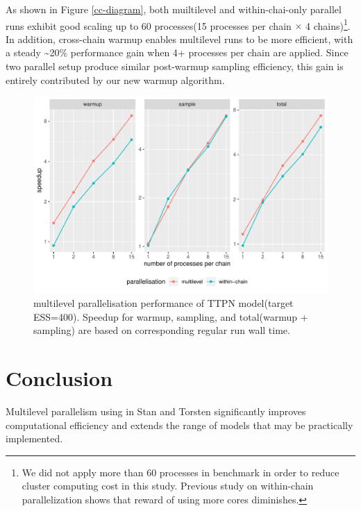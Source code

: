 \documentclass[11pt, reqno, oneside]{amsart}
\begin{document}
As shown in Figure \ref{cc-diagram}, both muiltilevel and
within-chai-only parallel runs exhibit good scaling up to 60
processes(15 processes per chain \(\times\) 4 chains)\footnote{We did not apply more than 60 processes in benchmark in order
to reduce cluster computing cost in this study. Previous study on within-chain parallelization
\cite{torsten_pmx_group} shows that reward of using more cores
diminishes.}. In
addition, cross-chain warmup enables multilevel runs to be more
efficient, with a steady \textasciitilde{}20\% performance gain when 4+ processes per
chain are applied. Since two parallel setup produce similar
post-warmup sampling efficiency, this gain is entirely contributed by
our new warmup algorithm.

\begin{figure}[htbp]
\centering
\includegraphics[width=\textwidth]{./figure/ttpn2_perf_benchmark.pdf}
\caption{multilevel parallelisation performance of TTPN model(target ESS=400). Speedup for warmup, sampling, and total(warmup + sampling) are based on corresponding regular run wall time. \label{ttpn_perf}}
\end{figure}

\section{Conclusion}
\label{sec:org25e5b88}
Multilevel parallelism using in Stan and Torsten
significantly improves computational efficiency and extends
the range of models that may be practically implemented.



\end{document}
